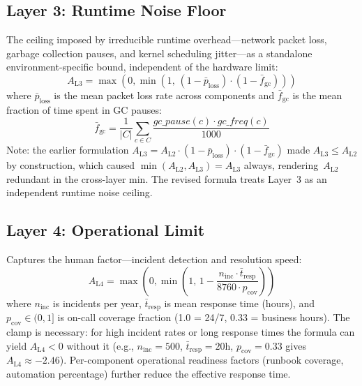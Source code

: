 \documentclass[10pt,twocolumn]{article}
\begin{document}
\subsection{Layer 3: Runtime Noise Floor}
The ceiling imposed by irreducible runtime overhead---network packet
loss, garbage collection pauses, and kernel scheduling jitter---as a
standalone environment-specific bound, independent of the hardware
limit:
\begin{equation}
  A_{\text{L3}} = \max\!\left(0, \min\!\left(1,\,
    (1 - \bar{p}_{\text{loss}}) \cdot (1 - \bar{f}_{\text{gc}})\right)\right)
\end{equation}
where $\bar{p}_{\text{loss}}$ is the mean packet loss rate across
components and $\bar{f}_{\text{gc}}$ is the mean fraction of time
spent in GC pauses:
\begin{equation}
  \bar{f}_{\text{gc}} = \frac{1}{|C|} \sum_{c \in C}
    \frac{\mathit{gc\_pause}(c) \cdot \mathit{gc\_freq}(c)}{1000}
\end{equation}
Note: the earlier formulation $A_{\text{L3}} = A_{\text{L2}} \cdot
(1-\bar{p}_{\text{loss}}) \cdot (1-\bar{f}_{\text{gc}})$ made
$A_{\text{L3}} \le A_{\text{L2}}$ by construction, which caused
$\min(A_{\text{L2}}, A_{\text{L3}}) = A_{\text{L3}}$ always,
rendering~$A_{\text{L2}}$ redundant in the cross-layer min.
The revised formula treats Layer~3 as an independent runtime
noise ceiling.

\subsection{Layer 4: Operational Limit}
Captures the human factor---incident detection and resolution speed:
\begin{equation}
  A_{\text{L4}} = \max\!\left(0, \min\!\left(1,\,
    1 - \frac{n_{\text{inc}} \cdot \bar{t}_{\text{resp}}}{8760 \cdot p_{\text{cov}}}\right)\right)
\end{equation}
where $n_{\text{inc}}$ is incidents per year,
$\bar{t}_{\text{resp}}$ is mean response time (hours),
and $p_{\text{cov}} \in (0, 1]$ is on-call coverage fraction
(1.0 = 24/7, 0.33 = business hours).
The clamp is necessary: for high incident rates or long response times
the formula can yield $A_{\text{L4}} < 0$ without it
(e.g., $n_{\text{inc}} = 500$, $\bar{t}_{\text{resp}} = 20$h,
$p_{\text{cov}} = 0.33$ gives $A_{\text{L4}} \approx -2.46$).
Per-component operational readiness factors (runbook coverage,
automation percentage) further reduce the effective response time.
\end{document}
